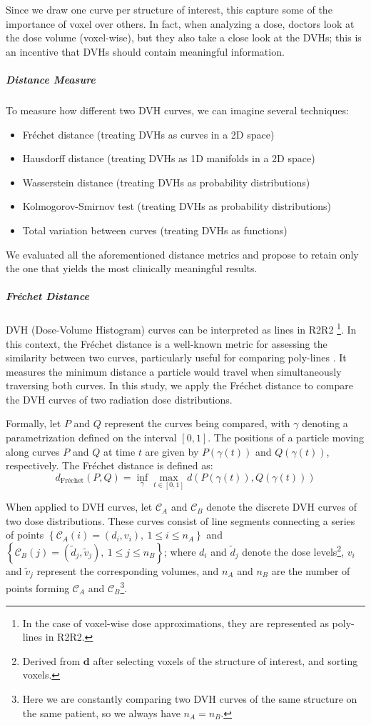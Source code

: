 Since we draw one curve per structure of interest, this capture some of the importance of voxel over others.
In fact, when analyzing a dose, doctors look at the dose volume (voxel-wise), but they also take a close look at the DVHs; this is an incentive that DVHs should contain meaningful information.

\subparagraph{Distance Measure}
To measure how different two DVH curves, we can imagine several techniques:
\begin{itemize}
	\item Fréchet distance (treating DVHs as curves in a 2D space)
	\item Hausdorff distance (treating DVHs as 1D manifolds in a 2D space)
	\item Wasserstein distance (treating DVHs as probability distributions)
	\item Kolmogorov-Smirnov test (treating DVHs as probability distributions)
	\item Total variation between curves (treating DVHs as functions)
\end{itemize}
We evaluated all the aforementioned distance metrics and propose to retain only the one that yields the most clinically meaningful results.

\subparagraph{Fréchet Distance}
DVH (Dose-Volume Histogram) curves can be interpreted as lines in R2R2 \footnote{In the case of voxel-wise dose approximations, they are represented as poly-lines in R2R2.}.
In this context, the Fréchet distance is a well-known metric for assessing the similarity between two curves, particularly useful for comparing poly-lines \cite{Efrat2002}.
It measures the minimum distance a particle would travel when simultaneously traversing both curves.
In this study, we apply the Fréchet distance to compare the DVH curves of two radiation dose distributions.

Formally, let $P$ and $Q$ represent the curves being compared, with $\gamma$ denoting a parametrization defined on the interval $\left[0,1\right]$.
The positions of a particle moving along curves $P$ and $Q$ at time $t$ are given by $P(\gamma(t))$ and $Q(\gamma(t))$, respectively.
The Fréchet distance is defined as:
$$d_{\text{Fréchet}}(P,Q) = \inf_{\gamma}{ \max_{t \in \left[ 0,1 \right]} d(P(\gamma(t)), Q(\gamma(t)))}$$

When applied to DVH curves, let $\mathcal{C}_A$ and $\mathcal{C}_B$ denote the discrete DVH curves of two dose distributions.
These curves consist of line segments connecting a series of points $\left\lbrace \mathcal{C}_A(i) = (d_i, v_i), \ 1 \leq i \leq n_A \right\rbrace $ and $\left\lbrace \mathcal{C}_B(j) = (\tilde{d}_j, \tilde{v}_j), \ 1 \leq j \leq n_B \right\rbrace $; where $d_i$ and $\tilde{d}_j$ denote the dose levels\footnote{Derived from $\textbf{d}$ after selecting voxels of the structure of interest, and sorting voxels.}, $v_i$ and $\tilde{v}_j$ represent the corresponding volumes, and $n_A$ and $n_B$ are the number of points forming $\mathcal{C}_A$ and $\mathcal{C}_B$\footnote{Here we are constantly comparing two DVH curves of the same structure on the same patient, so we always have $n_A = n_B$.}.

